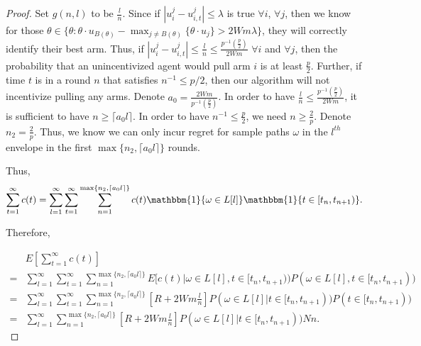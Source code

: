 \documentclass{article}
\begin{document}
\begin{proof}
Set $g(n,l)$ to be $\frac{l}{n}$. Since if $|u_{i}^{j}-u_{i,t}^{j}|\leq \lambda$ is true $\forall i$, $\forall j$, then we know for those $\theta\in \{\theta:\theta\cdot u_{B(\theta)}-\max_{j\neq B(\theta)}\{\theta \cdot u_{j}\}> 2Wm\lambda\}$, they will correctly identify their best arm. Thus, if $|u_{i}^{j}-u_{i,t}^{j}|\leq \frac{l}{n} \leq \frac{p^{-1}(\frac{p}{2})}{2Wm}$ $\forall i$ and $\forall j$, then the probability that an unincentivized agent would pull arm $i$ is at least $\frac{p}{2}$. Further, if time $t$ is in a round $n$ that satisfies $n^{-1}\leq p/2$, then our algorithm will not incentivize pulling any arms. Denote $a_0=\frac{2Wm}{p^{-1}(\frac{p}{2})}$. In order to have $\frac{l}{n}\leq \frac{p^{-1}(\frac{p}{2})}{2Wm}$, it is sufficient to have $n\geq \lceil a_{0} l\rceil$. In order to have $n^{-1}\leq \frac{p}{2}$, we need $n\geq \frac{2}{p}$. Denote $n_2=\frac{2}{p}$. Thus, we know we can only incur regret for sample paths $\omega$ in the $l^{th}$ envelope in the first $\max\{n_2,\lceil a_0 l\rceil\}$ rounds.

Thus,
\begin{align}
\sum_{t=1}^{\infty}c(t)=\sum_{l=1}^{\infty}\sum_{t=1}^{\infty}\sum_{n=1}^{\max\{n_2,\lceil a_0 l\rceil\}}c(t)\mathbbm{1}\{\omega\in L[l]\}\mathbbm{1}\{t\in [t_n,t_{n+1})\}. \nonumber
\end{align}

Therefore,

\begin{align}
&E\left[\sum_{t=1}^{\infty}c(t)\right] \nonumber\\
=&\sum_{l=1}^{\infty}\sum_{t=1}^{\infty}\sum_{n=1}^{\max\{n_2,\lceil a_0 l\rceil\}}E[c(t)|\omega \in L[l],t\in [t_n,t_{n+1}))P(\omega\in L[l],t\in [t_n,t_{n+1})) \nonumber \\
=&\sum_{l=1}^{\infty}\sum_{t=1}^{\infty}\sum_{n=1}^{\max\{n_2,\lceil a_0 l\rceil\}}\left[R+2Wm\frac{l}{n}\right]P(\omega\in L[l]|t\in [t_n,t_{n+1}))P(t\in [t_n,t_{n+1})) \nonumber \\
=&\sum_{l=1}^{\infty}\sum_{n=1}^{\max\{n_2,\lceil a_0 l\rceil\}}\left[R+2Wm\frac{l}{n}\right]P(\omega\in L[l]|t\in [t_n,t_{n+1}))Nn. \nonumber
\end{align}


\end{proof}
\end{document}
